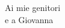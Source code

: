 \vspace*{10pc}
\thispagestyle{plain}

\begin{flushright}
\sl

Ai mie genitori\\
e a Giovanna

\end{flushright}
\par\vfill\par

